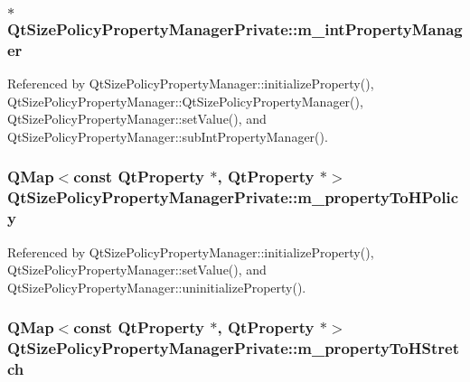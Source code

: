 \subsubsection[{m\+\_\+int\+Property\+Manager}]{$\ast$ Qt\+Size\+Policy\+Property\+Manager\+Private\+::m\+\_\+int\+Property\+Manager}\label{classQtSizePolicyPropertyManagerPrivate_a462a572145d15f19e560f66e03f17889}


Referenced by Qt\+Size\+Policy\+Property\+Manager\+::initialize\+Property(), Qt\+Size\+Policy\+Property\+Manager\+::\+Qt\+Size\+Policy\+Property\+Manager(), Qt\+Size\+Policy\+Property\+Manager\+::set\+Value(), and Qt\+Size\+Policy\+Property\+Manager\+::sub\+Int\+Property\+Manager().

\subsubsection[{m\+\_\+property\+To\+H\+Policy}]{\setlength{\rightskip}{0pt plus 5cm}Q\+Map$<$const {\bf Qt\+Property} $\ast$, {\bf Qt\+Property} $\ast$$>$ Qt\+Size\+Policy\+Property\+Manager\+Private\+::m\+\_\+property\+To\+H\+Policy}\label{classQtSizePolicyPropertyManagerPrivate_aee4e78fd1e95f401817803a019c187ee}


Referenced by Qt\+Size\+Policy\+Property\+Manager\+::initialize\+Property(), Qt\+Size\+Policy\+Property\+Manager\+::set\+Value(), and Qt\+Size\+Policy\+Property\+Manager\+::uninitialize\+Property().

\subsubsection[{m\+\_\+property\+To\+H\+Stretch}]{\setlength{\rightskip}{0pt plus 5cm}Q\+Map$<$const {\bf Qt\+Property} $\ast$, {\bf Qt\+Property} $\ast$$>$ Qt\+Size\+Policy\+Property\+Manager\+Private\+::m\+\_\+property\+To\+H\+Stretch}\label{classQtSizePolicyPropertyManagerPrivate_a52a6d4bd8b5b33faf28568a7fabfb746}



